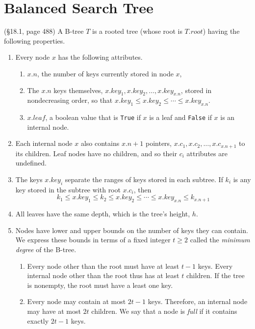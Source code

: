\section{Balanced Search Tree} (\S 18.1, page 488) A B-tree $T$ is a rooted tree (whose root is $T.root$) having the following properties.  
	\begin{enumerate}
		\item Every node $x$ has the following attributes.
		\begin{enumerate}
			\item $x.n$, the number of keys currently stored in node $x$, 
			\item The $x.n$ keys themselves, $x.key_1, x.key_2, \dots, x.key_{x.n}$, stored in nondecreasing order, so that $x.key_1 \le x.key_2 \le \cdots \le x.key_{x.n}$.
			\item $x.leaf$, a boolean value that is \verb|True| if $x$ is a leaf and \verb|False| if $x$ is an internal node.  
		\end{enumerate}
		\item Each internal node $x$ also contains $x.n+1$ pointers, $x.c_1, x.c_2, \dots, x.c_{x.n+1}$ to its children.  Leaf nodes have no children, and so their $c_i$ attributes are undefined.  
		\item The keys $x.key_i$ separate the ranges of keys stored in each subtree.  If $k_i$ is any key stored in the subtree with root $x.c_i$, then 
		$$k_1 \le x.key_1 \le k_2 \le x.key_2 \le \cdots \le x.key_{x.n} \le k_{x.n+1}$$
		\item All leaves have the same depth, which is the tree's height, $h$.  
		\item Nodes have lower and upper bounds on the number of keys they can contain.  We express these bounds in terms of a fixed integer $t \ge 2$ called the {\it minimum degree} of the B-tree.  
		\begin{enumerate}
			\item Every node other than the root must have at least $t-1$ keys.  Every internal node other than the root thus has at least $t$ children.  If the tree is nonempty, the root must have a least one key.  
			\item Every node may contain at most $2t-1$ keys.  Therefore, an internal node may have at most $2t$ children.  We say that a node is {\it full} if it contains exactly $2t-1$ keys.  
		\end{enumerate}
	\end{enumerate} 
	
